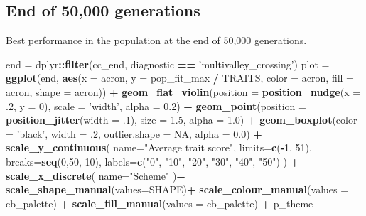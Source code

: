 \documentclass[]{book}
\newenvironment{Shaded}{\begin{snugshade}}{\end{snugshade}}
\newcommand{\DataTypeTok}[1]{\textcolor[rgb]{0.13,0.29,0.53}{#1}}
\newcommand{\DecValTok}[1]{\textcolor[rgb]{0.00,0.00,0.81}{#1}}
\newcommand{\FloatTok}[1]{\textcolor[rgb]{0.00,0.00,0.81}{#1}}
\newcommand{\KeywordTok}[1]{\textcolor[rgb]{0.13,0.29,0.53}{\textbf{#1}}}
\newcommand{\NormalTok}[1]{#1}
\newcommand{\OperatorTok}[1]{\textcolor[rgb]{0.81,0.36,0.00}{\textbf{#1}}}
\newcommand{\OtherTok}[1]{\textcolor[rgb]{0.56,0.35,0.01}{#1}}
\newcommand{\StringTok}[1]{\textcolor[rgb]{0.31,0.60,0.02}{#1}}
\begin{document}
\hypertarget{end-of-50000-generations-6}{%
\subsection{End of 50,000 generations}\label{end-of-50000-generations-6}}

Best performance in the population at the end of 50,000 generations.

\begin{Shaded}
\begin{Highlighting}[]
\NormalTok{end =}\StringTok{ }\NormalTok{dplyr}\OperatorTok{::}\KeywordTok{filter}\NormalTok{(cc_end, diagnostic }\OperatorTok{==}\StringTok{ 'multivalley_crossing'}\NormalTok{)}
\NormalTok{plot =}\StringTok{ }\KeywordTok{ggplot}\NormalTok{(end, }\KeywordTok{aes}\NormalTok{(}\DataTypeTok{x =}\NormalTok{ acron, }\DataTypeTok{y =}\NormalTok{ pop_fit_max }\OperatorTok{/}\StringTok{ }\NormalTok{TRAITS, }\DataTypeTok{color =}\NormalTok{ acron, }\DataTypeTok{fill =}\NormalTok{ acron, }\DataTypeTok{shape =}\NormalTok{ acron)) }\OperatorTok{+}
\StringTok{  }\KeywordTok{geom_flat_violin}\NormalTok{(}\DataTypeTok{position =} \KeywordTok{position_nudge}\NormalTok{(}\DataTypeTok{x =} \FloatTok{.2}\NormalTok{, }\DataTypeTok{y =} \DecValTok{0}\NormalTok{), }\DataTypeTok{scale =} \StringTok{'width'}\NormalTok{, }\DataTypeTok{alpha =} \FloatTok{0.2}\NormalTok{) }\OperatorTok{+}
\StringTok{  }\KeywordTok{geom_point}\NormalTok{(}\DataTypeTok{position =} \KeywordTok{position_jitter}\NormalTok{(}\DataTypeTok{width =} \FloatTok{.1}\NormalTok{), }\DataTypeTok{size =} \FloatTok{1.5}\NormalTok{, }\DataTypeTok{alpha =} \FloatTok{1.0}\NormalTok{) }\OperatorTok{+}
\StringTok{  }\KeywordTok{geom_boxplot}\NormalTok{(}\DataTypeTok{color =} \StringTok{'black'}\NormalTok{, }\DataTypeTok{width =} \FloatTok{.2}\NormalTok{, }\DataTypeTok{outlier.shape =} \OtherTok{NA}\NormalTok{, }\DataTypeTok{alpha =} \FloatTok{0.0}\NormalTok{) }\OperatorTok{+}
\StringTok{  }\KeywordTok{scale_y_continuous}\NormalTok{(}
    \DataTypeTok{name=}\StringTok{"Average trait score"}\NormalTok{,}
    \DataTypeTok{limits=}\KeywordTok{c}\NormalTok{(}\OperatorTok{-}\DecValTok{1}\NormalTok{, }\DecValTok{51}\NormalTok{),}
    \DataTypeTok{breaks=}\KeywordTok{seq}\NormalTok{(}\DecValTok{0}\NormalTok{,}\DecValTok{50}\NormalTok{, }\DecValTok{10}\NormalTok{),}
    \DataTypeTok{labels=}\KeywordTok{c}\NormalTok{(}\StringTok{"0"}\NormalTok{, }\StringTok{"10"}\NormalTok{, }\StringTok{"20"}\NormalTok{, }\StringTok{"30"}\NormalTok{, }\StringTok{"40"}\NormalTok{, }\StringTok{"50"}\NormalTok{)}
\NormalTok{  ) }\OperatorTok{+}
\StringTok{  }\KeywordTok{scale_x_discrete}\NormalTok{(}
    \DataTypeTok{name=}\StringTok{"Scheme"}
\NormalTok{  )}\OperatorTok{+}
\StringTok{  }\KeywordTok{scale_shape_manual}\NormalTok{(}\DataTypeTok{values=}\NormalTok{SHAPE)}\OperatorTok{+}
\StringTok{  }\KeywordTok{scale_colour_manual}\NormalTok{(}\DataTypeTok{values =}\NormalTok{ cb_palette) }\OperatorTok{+}
\StringTok{  }\KeywordTok{scale_fill_manual}\NormalTok{(}\DataTypeTok{values =}\NormalTok{ cb_palette) }\OperatorTok{+}
\StringTok{  }\NormalTok{p_theme}


\end{Highlighting}
\end{Shaded}
\end{document}
